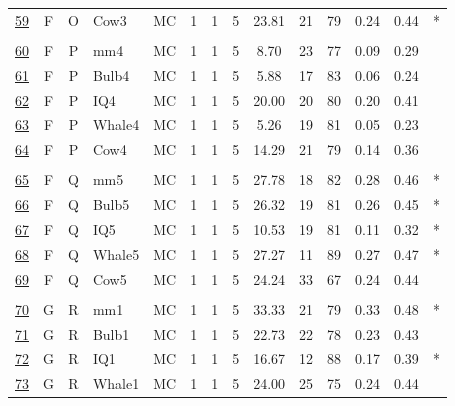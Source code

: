 \documentclass[12pt,nohyper]{tufte-handout}\usepackage[]{graphicx}\usepackage[]{color}
\begin{document}
\begin{longtable}{cccl|cccc|ccccc|l}
  \hyperlink{T06.F.O.05.1.1.MC.Cow3.2}{59} & F & O & Cow3 & MC &   1 &   1 &   5 & 23.81 &  21 &  79 & 0.24 & 0.44 & * \\ 
   &  &  &  &  &  &  &  &  &  &  &  &  &  \\ 
  \hyperlink{T06.F.P.05.1.1.MC.mm4.2}{60} & F & P & mm4 & MC &   1 &   1 &   5 & 8.70 &  23 &  77 & 0.09 & 0.29 &  \\ 
  \hyperlink{T06.F.P.05.1.1.MC.Bulb4.2}{61} & F & P & Bulb4 & MC &   1 &   1 &   5 & 5.88 &  17 &  83 & 0.06 & 0.24 &  \\ 
  \hyperlink{T06.F.P.05.1.1.MC.IQ4.2}{62} & F & P & IQ4 & MC &   1 &   1 &   5 & 20.00 &  20 &  80 & 0.20 & 0.41 &  \\ 
  \hyperlink{T06.F.P.05.1.1.MC.Whale4.2}{63} & F & P & Whale4 & MC &   1 &   1 &   5 & 5.26 &  19 &  81 & 0.05 & 0.23 &  \\ 
  \hyperlink{T06.F.P.05.1.1.MC.Cow4.2}{64} & F & P & Cow4 & MC &   1 &   1 &   5 & 14.29 &  21 &  79 & 0.14 & 0.36 &  \\ 
   &  &  &  &  &  &  &  &  &  &  &  &  &  \\ 
  \hyperlink{T06.F.Q.05.1.1.MC.mm5.2}{65} & F & Q & mm5 & MC &   1 &   1 &   5 & 27.78 &  18 &  82 & 0.28 & 0.46 & * \\ 
  \hyperlink{T06.F.Q.05.1.1.MC.Bulb5.2}{66} & F & Q & Bulb5 & MC &   1 &   1 &   5 & 26.32 &  19 &  81 & 0.26 & 0.45 & * \\ 
  \hyperlink{T06.F.Q.05.1.1.MC.IQ5.2}{67} & F & Q & IQ5 & MC &   1 &   1 &   5 & 10.53 &  19 &  81 & 0.11 & 0.32 & * \\ 
  \hyperlink{T06.F.Q.05.1.1.MC.Whale5.2}{68} & F & Q & Whale5 & MC &   1 &   1 &   5 & 27.27 &  11 &  89 & 0.27 & 0.47 & * \\ 
  \hyperlink{T06.F.Q.05.1.1.MC.Cow5.2}{69} & F & Q & Cow5 & MC &   1 &   1 &   5 & 24.24 &  33 &  67 & 0.24 & 0.44 &  \\ 
   &  &  &  &  &  &  &  &  &  &  &  &  &  \\ 
  \hyperlink{T06.G.R.05.1.1.MC.mm1.2}{70} & G & R & mm1 & MC &   1 &   1 &   5 & 33.33 &  21 &  79 & 0.33 & 0.48 & * \\ 
  \hyperlink{T06.G.R.05.1.1.MC.Bulb1.2}{71} & G & R & Bulb1 & MC &   1 &   1 &   5 & 22.73 &  22 &  78 & 0.23 & 0.43 &  \\ 
  \hyperlink{T06.G.R.05.1.1.MC.IQ1.2}{72} & G & R & IQ1 & MC &   1 &   1 &   5 & 16.67 &  12 &  88 & 0.17 & 0.39 & * \\ 
  \hyperlink{T06.G.R.05.1.1.MC.Whale1.2}{73} & G & R & Whale1 & MC &   1 &   1 &   5 & 24.00 &  25 &  75 & 0.24 & 0.44 &  \\ 

\end{longtable}
\end{document}
